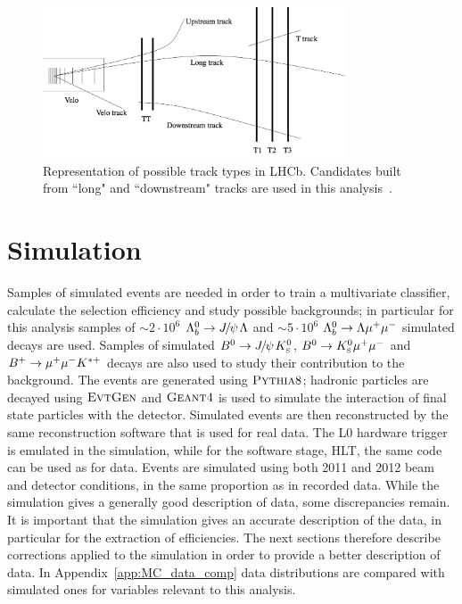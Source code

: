 \begin{figure}[hbt]
\centering
\includegraphics[width=0.8\textwidth,trim=0cm 0cm 0cm 5mm,]{Lmumu/figs/track_types.png}
\caption{Representation of possible track types in LHCb. Candidates built from ``long" and 
``downstream" tracks are used in this analysis~\cite{Alves:2008zz}.}
\label{fig:track_types}
\end{figure}
 
\section{Simulation}
\label{sec:Lb_simulation}

Samples of simulated events are needed in order to train a multivariate classifier,
 calculate the selection efficiency and study possible backgrounds;
in particular for this analysis samples of $\sim 2\cdot10^6$  $\Lb\to\jpsi\Lz$ and 
$\sim 5\cdot10^6$ ${{\Lambda}^0_{b}}\rightarrow{\ensuremath{\Lambda}}{\ensuremath{\mu^+\mu^-}}$ simulated decays are used.
Samples of simulated $\Bz\ra\jpsi\KS$, ${{B}^0}\rightarrow{\ensuremath{{K}^0_{\rm\scriptscriptstyle S}}}{\ensuremath{\mu^+\mu^-}}$ and $B^{+} \rightarrow{\ensuremath{\mu^+\mu^-}} K^{*+}$
decays are also used to study their contribution to the background. The events are generated using
$\textsc{Pythia}8$; hadronic particles are decayed using $\textsc{EvtGen}$ and $\textsc{Geant4}$ is used to simulate
the interaction of final state particles with the detector. Simulated events are then
reconstructed by the same reconstruction software that is used for real data. The L0 hardware
trigger is emulated in the simulation, while for the software stage, HLT,
the same code can be used as for data.
Events are simulated using both 2011 and 2012 beam and detector conditions, in the same proportion as
in recorded data. While the simulation gives a generally good description of data, some discrepancies remain.
It is important that the simulation gives an accurate description of the data, 
in particular for the extraction of efficiencies. The next sections therefore 
describe corrections applied to the simulation in order to provide a better description of data.
In Appendix~\ref{app:MC_data_comp} data distributions are compared with simulated ones for
variables relevant to this analysis.


